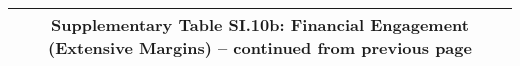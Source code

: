 \begin{longtable}{llcccccccccc}
\multicolumn{12}{c}{{\bfseries Supplementary Table SI.10b: Financial Engagement (Extensive Margins) -- continued from previous page}} \\ \hline                                                                                                                                                                                                                                                                                                                                                                                                                                                                                                                                                                                                                                                                                                                                           

\end{longtable}
